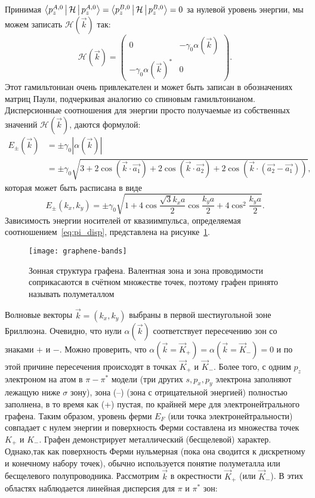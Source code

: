 Принимая \( \Braket{p_z^{A,0}|\mathcal{H}|p_z^{A,0}} = \Braket{p_z^{B,0}|\mathcal{H}|p_z^{B,0}} = 0 \) за нулевой уровень энергии, мы можем записать \( \mathcal{H}(\vec{k}) \) так:
\begin{equation*}  
    \mathcal{H}(\vec{k}) = 
    \begin{pmatrix}
        0 & -\gamma_0\alpha(\vec{k})\\
        -\gamma_0\alpha(\vec{k})^* & 0
    \end{pmatrix}.
\end{equation*}
Этот гамильтониан очень привлекателен и может быть записан в обозначениях матриц Паули, подчеркивая аналогию со спиновым гамильтонианом. Дисперсионные соотношения для энергии просто получаемые из собственных значений \(\mathcal{H}(\vec{k})\), даются формулой:
\begin{align*}
    E_\pm(\vec{k}) & = \pm\gamma_0|\alpha(\vec{k})|\\
                   & = \pm\gamma_0\sqrt{3+2\cos(\vec{k}\cdot\vec{a_1})+2\cos(\vec{k}\cdot\vec{a_2})+2\cos(\vec{k}\cdot(\vec{a_2}-\vec{a_1}))},
\end{align*}
которая может быть расписана в виде
\begin{equation}
    E_\pm(k_x, k_y) = \pm\gamma_0\sqrt{1 + 4\cos\frac{\sqrt{3}k_xa}{2}\cos\frac{k_ya}{2} + 4\cos^2\frac{k_ya}{2}}.
    \label{eq:pi_disp}
\end{equation}
Зависимость энергии носителей от квазиимпульса, определяемая соотношением~\eqref{eq:pi_disp}, представлена на рисунке~\ref{fig:graphene-bands}.
\begin{figure}[ht]
  \center
  \texttt{[image: graphene-bands]}
  \caption{Зонная структура графена. Валентная зона и зона проводимости соприкасаются в счётном множестве точек, поэтому графен принято называть полуметаллом}
  \label{fig:graphene-bands}
\end{figure}
Волновые векторы \(\vec{k} = (k_x, k_y)\) выбраны в первой шестиугольной зоне Бриллюэна. Очевидно, что нули \(\alpha(\vec{k})\) соответствует пересечению зон со знаками \(+\) и \(-\). Можно проверить, что \(\alpha(\vec{k} = \vec{K}_+) = \alpha(\vec{k} = \vec{K}_-) = 0\) и по этой причине пересечения происходят в точках \(\vec{K}_+\) и \(\vec{K}_-\). Более того, с одним \(p_z\) электроном на атом в \(\pi-\pi^*\) модели (три других \(s,p_x,p_y\) электрона заполняют лежащую ниже \(\sigma\) зону), зона (--) (зона с отрицательной энергией) полностью заполнена, в то время как (+) пустая, по крайней мере для электронейтрального графена. Таким образом, уровень ферми \( E_F \) (или точка электронейтральности) совпадает с нулем энергии и поверхность Ферми составлена из множества точек \(K_+\) и \(K_-\). Графен демонстрирует металлический (бесщелевой) характер. Однако,так как поверхность Ферми нульмерная (пока она сводится к дискретному и конечному набору точек), обычно используется понятие полуметалла или бесщелевого полупроводника. Рассмотрим \(\vec{k}\) в окрестности \(\vec{K}_+\) (или \(\vec{K}_-\)). В этих областях наблюдается линейная дисперсия для \(\pi\) и \(\pi^*\) зон:
